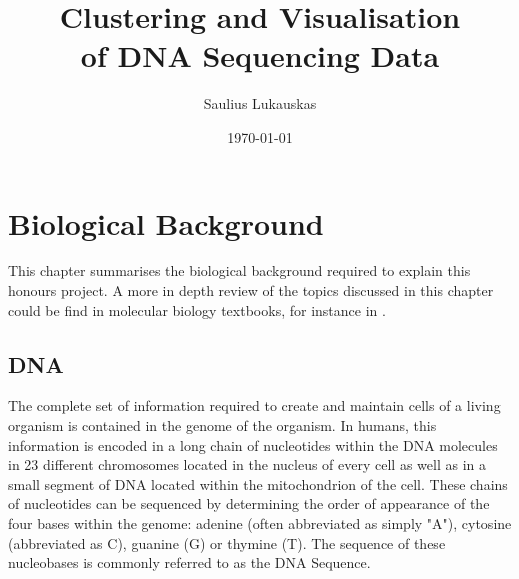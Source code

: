 \documentclass[parskip]{cs4rep}
\begin{document}
\title{Clustering and Visualisation\\ of DNA Sequencing Data}

\author{Saulius Lukauskas}


\date{\today}


\maketitle


\tableofcontents



\chapter{Biological Background}
This chapter summarises the biological background required to explain this honours project.
A more in depth review of the topics discussed in this chapter could be find in molecular biology textbooks, for instance in \cite{Alberts:2002te}.

\section{DNA}

The complete set of information required to create and maintain cells of a
living organism is contained in the genome of the organism. In humans, this
information is encoded in a long chain of nucleotides within the DNA molecules
in 23 different chromosomes located in the nucleus of every cell as well as in
a small segment of DNA located within the mitochondrion of the cell.  
These chains of nucleotides can be sequenced by determining the order of appearance
of the four bases within the genome: adenine (often abbreviated as simply "A"), cytosine (abbreviated as C),
guanine (G) or thymine (T).
The sequence of these nucleobases is commonly referred to as the DNA Sequence. 
\end{document}
